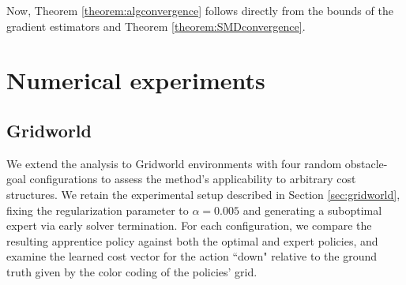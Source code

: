 \documentclass[10pt]{article} %
\begin{document}
Now, Theorem \ref{theorem:algconvergence}  follows directly from the bounds of the gradient estimators and Theorem \ref{theorem:SMDconvergence}.

\section{Numerical experiments}

\subsection{Gridworld}
We extend the analysis to Gridworld environments with four random obstacle-goal configurations to assess the method's applicability to arbitrary cost structures. We retain the experimental setup described in Section \ref{sec:gridworld}, fixing the regularization parameter to $\alpha=0.005$ and generating a suboptimal expert via early solver termination. For each configuration, we compare the resulting apprentice policy against both the optimal and expert policies, and examine the learned cost vector for the action ``down" relative to the ground truth given by the color coding of the policies' grid.
\end{document}
